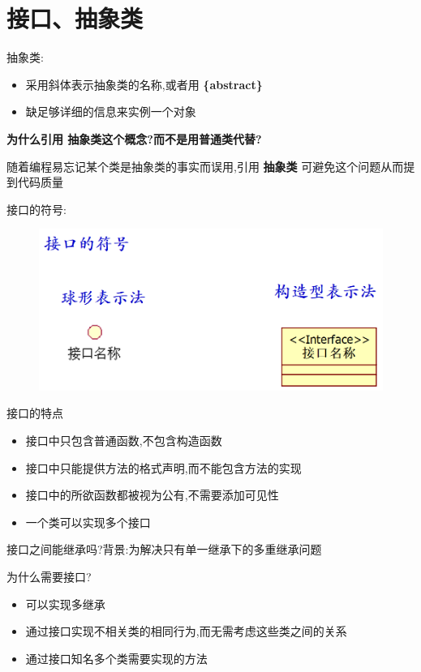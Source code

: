 \documentclass[UTF8,a4paper]{ctexart}
\begin{document}
\section{接口、抽象类}
抽象类:
\begin{itemize}
  \item 采用斜体表示抽象类的名称,或者用 \textbf{\{abstract\}  }
  \item 缺足够详细的信息来实例一个对象
\end{itemize}

\textbf{为什么引用 抽象类这个概念?而不是用普通类代替?}

随着编程易忘记某个类是抽象类的事实而误用,引用 \textbf{抽象类} 可避免这个问题从而提到代码质量


接口的符号:
\begin{figure}[H]
  \centering
  \includegraphics[scale = 0.3]{assets/SoftwareEngineering_22c0e.png}
\end{figure}

接口的特点
\begin{itemize}
  \item 接口中只包含普通函数,不包含构造函数
  \item 接口中只能提供方法的格式声明,而不能包含方法的实现
  \item 接口中的所欲函数都被视为公有,不需要添加可见性
  \item 一个类可以实现多个接口
\end{itemize}

接口之间能继承吗?背景:为解决只有单一继承下的多重继承问题

为什么需要接口?
\begin{itemize}
  \item 可以实现多继承
  \item 通过接口实现不相关类的相同行为,而无需考虑这些类之间的关系
  \item 通过接口知名多个类需要实现的方法
\end{itemize}
\end{document}

